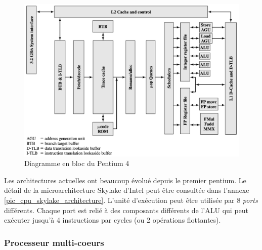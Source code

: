 \begin{figure}
    \center
    \includegraphics[width=13cm]{images/cpu_superscalar_pentium.png}
    \caption[Diagramme en bloc du Pentium 4]{Diagramme en bloc du Pentium 4 \cite{stallings2003organisation}
    \label{cpu_superscalar_pentium}}
\end{figure}



Les architectures actuelles ont beaucoup évolué depuis le premier pentium. Le détail de la microarchitecture Skylake d'Intel peut être consultée dans l'annexe \autoref{pic_cpu_skylake_architecture}. L'unité d'exécution peut être utilisée par 8 \textit{ports} différents. Chaque port est relié à des composants différents de l'ALU qui peut exécuter jusqu'à 4 instructions par cycles (ou 2 opérations flottantes).






\subsubsection{Processeur multi-coeurs} \label{sec:multicore}


